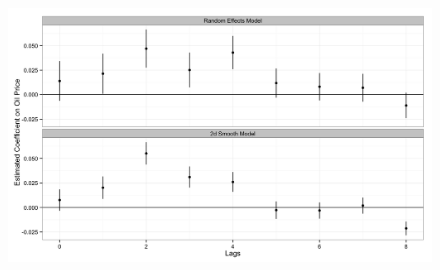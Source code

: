 \documentclass{beamer}
\begin{document}
\begin{frame}
	\begin{figure}
		\includegraphics[width=1\textwidth]{figures/price_coefficents.png}
		\label{price_coefficients}
	\end{figure}
\end{frame}
\end{document}
